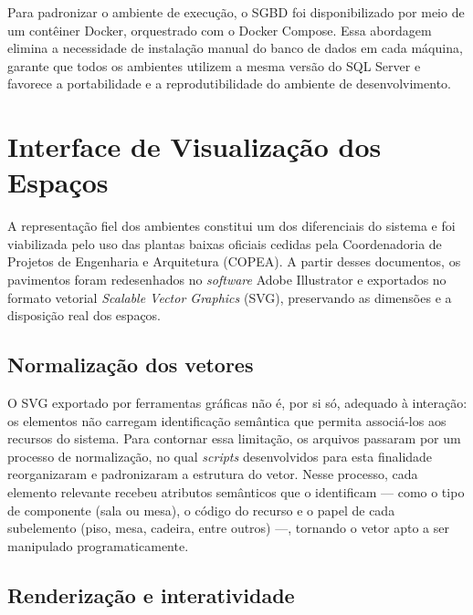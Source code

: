 Para padronizar o ambiente de execução, o SGBD foi disponibilizado por meio de um contêiner Docker, orquestrado com o Docker Compose. %
Essa abordagem elimina a necessidade de instalação manual do banco de dados em cada máquina, garante que todos os ambientes utilizem a mesma versão do SQL Server e favorece a portabilidade e a reprodutibilidade do ambiente de desenvolvimento.

\section{Interface de Visualização dos Espaços}\label{sec:interface}

A representação fiel dos ambientes constitui um dos diferenciais do sistema e foi viabilizada pelo uso das plantas baixas oficiais cedidas pela Coordenadoria de Projetos de Engenharia e Arquitetura (COPEA). A partir desses documentos, os pavimentos foram redesenhados no \textit{software} Adobe Illustrator e exportados no formato vetorial \textit{Scalable Vector Graphics} (SVG), preservando as dimensões e a disposição real dos espaços.

\subsection{Normalização dos vetores}\label{subsec:normalizacao}

O SVG exportado por ferramentas gráficas não é, por si só, adequado à interação: os elementos não carregam identificação semântica que permita associá-los aos recursos do sistema. Para contornar essa limitação, os arquivos passaram por um processo de normalização, no qual \textit{scripts} desenvolvidos para esta finalidade reorganizaram e padronizaram a estrutura do vetor. Nesse processo, cada elemento relevante recebeu atributos semânticos que o identificam — como o tipo de componente (sala ou mesa), o código do recurso e o papel de cada subelemento (piso, mesa, cadeira, entre outros) —, tornando o vetor apto a ser manipulado programaticamente.

\subsection{Renderização e interatividade}\label{subsec:renderizacao}

